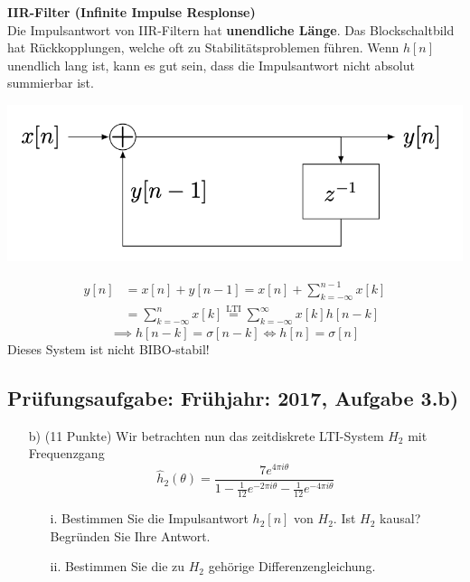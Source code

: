 \documentclass[11pt]{article}
\begin{document}
\begin{minipage}[t]{0.48\textwidth} %
    \textbf{IIR-Filter (Infinite Impulse Resplonse)}\\[0.5em]
    Die Impulsantwort von IIR-Filtern hat \textbf{unendliche Länge}. Das Blockschaltbild hat Rückkopplungen, welche oft zu Stabilitätsproblemen führen. Wenn $h[n]$ unendlich lang ist, kann es gut sein, dass die Impulsantwort nicht absolut summierbar ist.\\
    \vspace*{-0.5cm}
    \begin{center}
        \includegraphics[width=\linewidth]{docimgs/IIR.png}
    \end{center}
    \begin{align*}
        y[n] &= x[n] + y[n-1] = x[n] + \sum_{k=-\infty}^{n-1}x[k] \\
        &= \sum_{k=-\infty}^n x[k] \overset{\text{LTI}}{=} \sum_{k=-\infty}^\infty x[k]h[n-k]
    \end{align*}
    $$\implies h[n-k] = \sigma[n-k] \Leftrightarrow h[n] = \sigma[n]$$
    Dieses System ist nicht BIBO-stabil!
\end{minipage}

\vfill \null
\pagebreak

\subsection*{Prüfungsaufgabe: Frühjahr: 2017, Aufgabe 3.b)}
\begin{itemize}
    \item[b)] (11 Punkte) Wir betrachten nun das zeitdiskrete LTI-System $H_2$ mit Frequenzgang
    $$\hat{h}_2(\theta) = \frac{7 e^{4 \pi i \theta}}{1- \frac{1}{12}e^{-2\pi i \theta} - \frac{1}{12} e^{-4 \pi i \theta}}$$
    \begin{itemize}
        \item[i.] Bestimmen Sie die Impulsantwort $h_2[n]$ von $H_2$. Ist $H_2$ kausal? Begründen Sie Ihre Antwort.
        \item[ii.] Bestimmen Sie die zu $H_2$ gehörige Differenzengleichung.
    \end{itemize}
\end{itemize}
\end{document}
